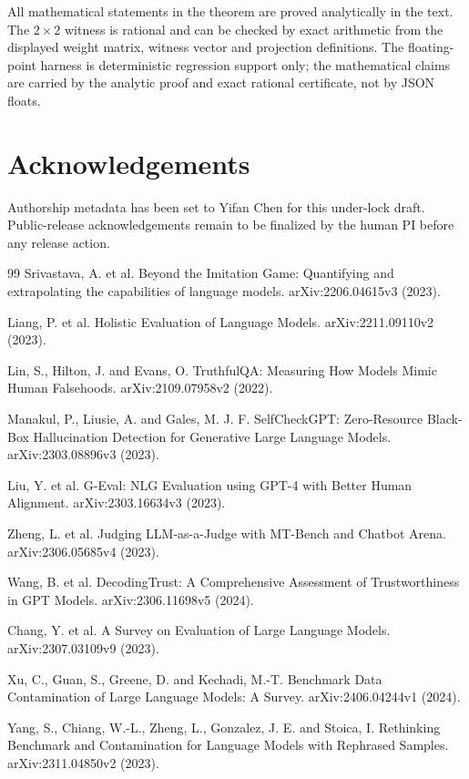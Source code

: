 \documentclass[11pt]{article}
\theoremstyle{remark}
\begin{document}
All mathematical statements in the theorem are proved analytically in the text. The $2\times2$ witness is rational and can be checked by exact arithmetic from the displayed weight matrix, witness vector and projection definitions. The floating-point harness is deterministic regression support only; the mathematical claims are carried by the analytic proof and exact rational certificate, not by JSON floats.

\section*{Acknowledgements}
Authorship metadata has been set to Yifan Chen for this under-lock draft. Public-release acknowledgements remain to be finalized by the human PI before any release action.

\begin{thebibliography}{99}
Srivastava, A. et al. Beyond the Imitation Game: Quantifying and extrapolating the capabilities of language models. arXiv:2206.04615v3 (2023).

Liang, P. et al. Holistic Evaluation of Language Models. arXiv:2211.09110v2 (2023).

Lin, S., Hilton, J. and Evans, O. TruthfulQA: Measuring How Models Mimic Human Falsehoods. arXiv:2109.07958v2 (2022).

Manakul, P., Liusie, A. and Gales, M. J. F. SelfCheckGPT: Zero-Resource Black-Box Hallucination Detection for Generative Large Language Models. arXiv:2303.08896v3 (2023).

Liu, Y. et al. G-Eval: NLG Evaluation using GPT-4 with Better Human Alignment. arXiv:2303.16634v3 (2023).

Zheng, L. et al. Judging LLM-as-a-Judge with MT-Bench and Chatbot Arena. arXiv:2306.05685v4 (2023).

Wang, B. et al. DecodingTrust: A Comprehensive Assessment of Trustworthiness in GPT Models. arXiv:2306.11698v5 (2024).

Chang, Y. et al. A Survey on Evaluation of Large Language Models. arXiv:2307.03109v9 (2023).

Xu, C., Guan, S., Greene, D. and Kechadi, M.-T. Benchmark Data Contamination of Large Language Models: A Survey. arXiv:2406.04244v1 (2024).

Yang, S., Chiang, W.-L., Zheng, L., Gonzalez, J. E. and Stoica, I. Rethinking Benchmark and Contamination for Language Models with Rephrased Samples. arXiv:2311.04850v2 (2023).


\end{thebibliography}
\end{document}

